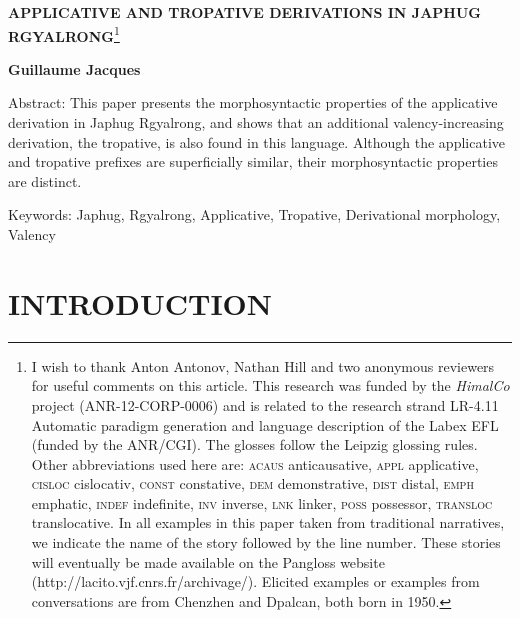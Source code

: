 \documentclass[oldfontcommands,twoside,a4paper,12pt]{article}
\begin{document}
 
\begin{flushright}

\end{flushright}
\renewcommand{\headrulewidth}{0pt}
\renewcommand{\refname}{\uppercase{references}}
\large
{}

\begin{center}
 \textbf{\uppercase{Applicative and tropative derivations in Japhug Rgyalrong}}\footnote{I wish to thank Anton Antonov, Nathan Hill and two anonymous reviewers for useful comments on this article.  This research was funded by the \textit{HimalCo} project (ANR-12-CORP-0006) and  is related to the research strand LR-4.11  Automatic paradigm generation and language description of the Labex EFL (funded by the ANR/CGI). 
The glosses follow the Leipzig glossing rules. Other abbreviations used here are: \textsc{acaus} anticausative, \textsc{appl} applicative, \textsc{cisloc} cislocativ, \textsc{const} constative,   \textsc{dem} demonstrative, \textsc{dist} distal, \textsc{emph} emphatic, \textsc{indef} indefinite, \textsc{inv} inverse, \textsc{lnk} linker, \textsc{poss} possessor, \textsc{transloc} translocative. %
In all examples in this paper taken from traditional narratives, we indicate the name of the story followed by the line number. These stories will eventually be made available on the Pangloss website (http://lacito.vjf.cnrs.fr/archivage/). Elicited examples or examples from conversations are from Chenzhen and Dpalcan, both born in 1950.
} 
 \end{center}

\begin{center}
 \textbf{Guillaume Jacques}
 \end{center}

\normalsize
 \sloppy
Abstract:  This paper presents the morphosyntactic properties of the applicative  derivation  in  Japhug Rgyalrong, and shows that an additional   valency-increasing derivation, the tropative, is also found in this language. Although the applicative and tropative prefixes are superficially similar, their morphosyntactic properties are distinct.


Keywords: Japhug, Rgyalrong, Applicative, Tropative, Derivational morphology, Valency
\large
\section{\uppercase{introduction}}
\end{document}
